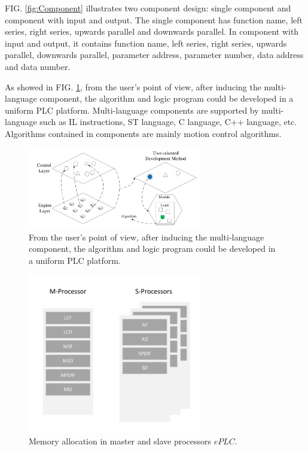 \documentclass[journal,UTF8]{IEEEtran}
\begin{document}
FIG. \ref{fig:Component} illustrates two component design: single component and component with input and output. The single component has function name, left series, right series, upwards parallel and downwards parallel. In component with input and output, it contains function name, left series, right series, upwards parallel, downwards parallel, parameter address, parameter number, data address and data number.

As showed in FIG. \ref{fig:SoftwareStructure}, from the user's point of view, after inducing the multi-language component, the algorithm and logic program could be developed in a uniform PLC platform. Multi-language components are supported by multi-language such as IL instructions, ST language, C language, C++ language, etc. Algorithms contained in components are mainly motion control algorithms.
\begin{figure}
	\centering
	\includegraphics[width=3in]{fig/FIG3.pdf}
	\caption{ From the user's point of view, after inducing the multi-language component, the algorithm and logic program could be developed in a uniform PLC platform.}
	\label{fig:SoftwareStructure}
\end{figure}


\begin{figure}
	\centering
	\includegraphics[width=3in]{fig/FIG4.pdf}
	\caption{ Memory allocation in master and slave processors $ePLC$.}
	\label{fig:Memory}
\end{figure}
\end{document}
